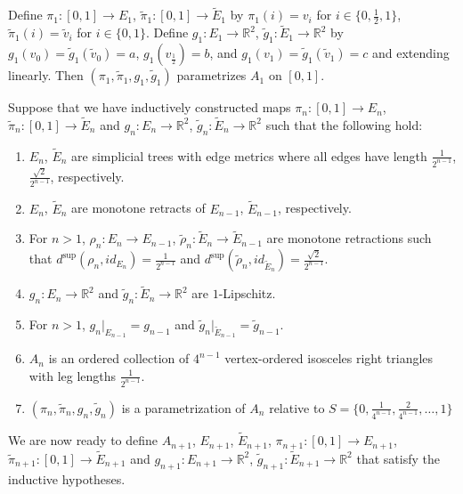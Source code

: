 \documentclass[11pt, leqno]{amsart}
\theoremstyle{definition}\newtheorem{definition}[theorem]{Definition}
\newcommand{\s}{\operatorname{sup}}
\begin{document}
Define $\pi_1: [0,1]\to E_1$, $\tilde\pi_1: [0,1]\to \tilde E_1$ by $\pi_1(i) = v_i$ for $i\in \{0, \frac12, 1\}$, $\tilde\pi_1(i) = \tilde v_i$ for $i\in \{0, 1\}$. Define $g_1: E_1\to \mathbb{R}^2$, $\tilde g_1: \tilde E_1\to \mathbb{R}^2$ by $g_1(v_0) = \tilde g_1(\tilde v_0) = a$, $g_1(v_\frac12)  = b$, and $g_1(v_1) = \tilde g_1(\tilde v_1) = c$ and extending linearly.  Then $(\pi_1, \tilde \pi_1, g_1, \tilde g_1)$ parametrizes $A_1$ on $[0,1]$.

Suppose that we have inductively constructed maps $\pi_n: [0,1]\to E_n$, $\tilde\pi_n: [0,1]\to \tilde E_n$ and  $g_n: E_n\to \mathbb{R}^2$, $\tilde g_n: \tilde E_n\to \mathbb{R}^2$ such that the following hold:

\begin{enumerate}
    \item $E_n$, $\tilde E_n$ are simplicial trees with edge metrics where all edges have length $\frac{1}{2^{n-1}}$, $\frac{\sqrt{2}}{2^{n-1}}$, respectively.
    \item $E_n$, $\tilde E_n$ are monotone retracts of $E_{n-1}$, $\tilde E_{n-1}$, respectively.
    \item\label{collapse} For $n>1$, $\rho_n: E_{n}\to E_{n-1}$, $\tilde \rho_n:\tilde  E_{n}\to\tilde  E_{n-1}$ are monotone retractions such that $d^{\s}(\rho_n, id_{E_n})=\frac{1}{2^{n-1}}$ and $d^{\s}(\tilde \rho_n, id_{\tilde E_n})=\frac{\sqrt2}{2^{n-1}}$.
    \item $g_n: E_n\to \mathbb{R}^2$ and $\tilde g_n: \tilde E_n\to \mathbb{R}^2$ are $1$-Lipschitz.
    \item For $n>1$, $g_n|_{E_{n-1}}= g_{n-1}$ and $\tilde g_n|_{\tilde E_{n-1}}= \tilde g_{n-1}$.
    \item $A_n$ is an ordered collection of $4^{n-1}$ vertex-ordered isosceles right triangles with leg lengths $\frac{1}{2^{n-1}}$.
    \item $(\pi_n, \tilde \pi_n, g_n, \tilde g_n) $ is a parametrization of $A_n$ relative to $S=\{0, \frac{1}{4^{n-1}}, \frac{2}{4^{n-1}}, \dots, 1\}$
\end{enumerate}

We are now ready to define $A_{n+1}$, $E_{n+1}$, $\tilde E_{n+1}$, $\pi_{n+1}: [0,1]\to E_{n+1}$, $\tilde\pi_{n+1}: [0,1]\to \tilde E_{n+1}$ and $g_{n+1}: E_{n+1}\to \mathbb{R}^2$, $\tilde g_{n+1}: \tilde E_{n+1}\to \mathbb{R}^2$ that satisfy the inductive hypotheses.
\end{document}
